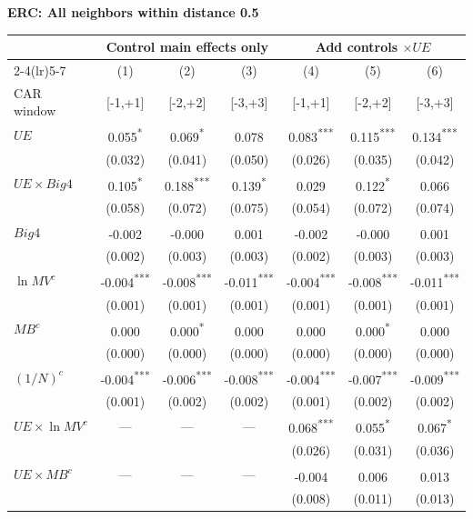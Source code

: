 \documentclass[10pt]{article}
\newcommand{\sym}[1]{\textsuperscript{#1}}
\begin{document}
\noindent\textbf{ERC: All neighbors within distance 0.5}\par\medskip
\setlength{\tabcolsep}{4pt}\renewcommand{\arraystretch}{1.12}
\noindent\begin{tabular*}{\textwidth}{@{\extracolsep{\fill}}lcccccc@{}}\toprule
 & \multicolumn{3}{c}{Control main effects only} & \multicolumn{3}{c}{Add controls \(\times UE\)} \\
\cmidrule(lr){2-4}\cmidrule(lr){5-7}
 & (1) & (2) & (3) & (4) & (5) & (6) \\
CAR window & [-1,+1] & [-2,+2] & [-3,+3] & [-1,+1] & [-2,+2] & [-3,+3] \\\midrule
\(UE\) & 0.055\sym{*} & 0.069\sym{*} & 0.078\sym{} & 0.083\sym{***} & 0.115\sym{***} & 0.134\sym{***} \\
 & (0.032) & (0.041) & (0.050) & (0.026) & (0.035) & (0.042) \\
\(UE\times Big4\) & 0.105\sym{*} & 0.188\sym{***} & 0.139\sym{*} & 0.029\sym{} & 0.122\sym{*} & 0.066\sym{} \\
 & (0.058) & (0.072) & (0.075) & (0.054) & (0.072) & (0.074) \\
\(Big4\) & -0.002\sym{} & -0.000\sym{} & 0.001\sym{} & -0.002\sym{} & -0.000\sym{} & 0.001\sym{} \\
 & (0.002) & (0.003) & (0.003) & (0.002) & (0.003) & (0.003) \\
\(\ln MV^c\) & -0.004\sym{***} & -0.008\sym{***} & -0.011\sym{***} & -0.004\sym{***} & -0.008\sym{***} & -0.011\sym{***} \\
 & (0.001) & (0.001) & (0.001) & (0.001) & (0.001) & (0.001) \\
\(MB^c\) & 0.000\sym{} & 0.000\sym{*} & 0.000\sym{} & 0.000\sym{} & 0.000\sym{*} & 0.000\sym{} \\
 & (0.000) & (0.000) & (0.000) & (0.000) & (0.000) & (0.000) \\
\((1/N)^c\) & -0.004\sym{***} & -0.006\sym{***} & -0.008\sym{***} & -0.004\sym{***} & -0.007\sym{***} & -0.009\sym{***} \\
 & (0.001) & (0.002) & (0.002) & (0.001) & (0.002) & (0.002) \\
\(UE\times\ln MV^c\) & --- & --- & --- & 0.068\sym{***} & 0.055\sym{*} & 0.067\sym{*} \\
 &  &  &  & (0.026) & (0.031) & (0.036) \\
\(UE\times MB^c\) & --- & --- & --- & -0.004\sym{} & 0.006\sym{} & 0.013\sym{} \\
 &  &  &  & (0.008) & (0.011) & (0.013) \\

\end{tabular*}
\end{document}
